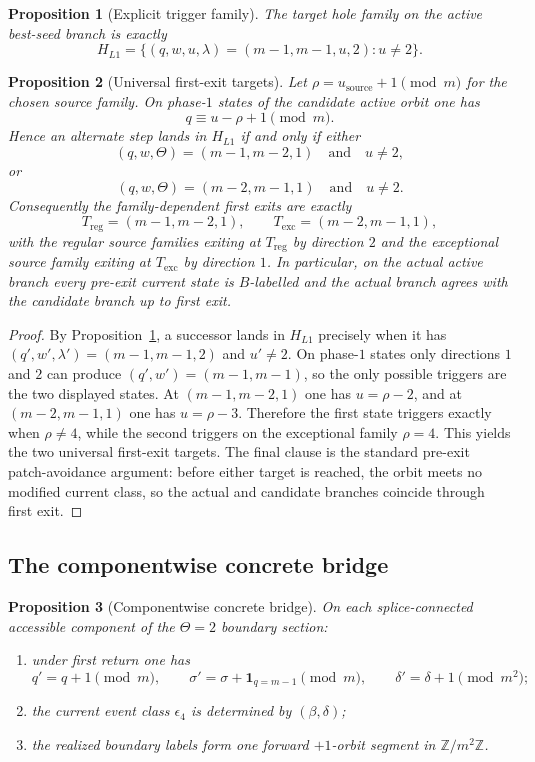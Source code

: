 \documentclass[11pt]{article}
\newtheorem{proposition}{Proposition}
\newcommand{\I}{\mathbf 1}
\begin{document}
\begin{proposition}[Explicit trigger family]\label{prop:d5-trigger}
The target hole family on the active best-seed branch is exactly
\[
H_{L1}=\{(q,w,u,\lambda)=(m-1,m-1,u,2):u\neq 2\}.
\]
\end{proposition}

\begin{proposition}[Universal first-exit targets]\label{prop:d5-first-exit}
Let $\rho=u_{\mathrm{source}}+1\pmod m$ for the chosen source family.
On phase-$1$ states of the candidate active orbit one has
\[
q\equiv u-\rho+1 \pmod m.
\]
Hence an alternate step lands in $H_{L1}$ if and only if either
\[
(q,w,\Theta)=(m-1,m-2,1)\quad\text{and}\quad u\neq 2,
\]
or
\[
(q,w,\Theta)=(m-2,m-1,1)\quad\text{and}\quad u\neq 2.
\]
Consequently the family-dependent first exits are exactly
\[
T_{\mathrm{reg}}=(m-1,m-2,1),
\qquad
T_{\mathrm{exc}}=(m-2,m-1,1),
\]
with the regular source families exiting at $T_{\mathrm{reg}}$ by direction $2$ and the exceptional source family exiting at $T_{\mathrm{exc}}$ by direction $1$.
In particular, on the actual active branch every pre-exit current state is $B$-labelled and the actual branch agrees with the candidate branch up to first exit.
\end{proposition}

\begin{proof}
By Proposition~\ref{prop:d5-trigger}, a successor lands in $H_{L1}$ precisely when it has
$(q',w',\lambda')=(m-1,m-1,2)$ and $u'\neq 2$.
On phase-$1$ states only directions $1$ and $2$ can produce $(q',w')=(m-1,m-1)$, so the only possible triggers are the two displayed states.
At $(m-1,m-2,1)$ one has $u=\rho-2$, and at $(m-2,m-1,1)$ one has $u=\rho-3$.
Therefore the first state triggers exactly when $\rho\neq 4$, while the second triggers on the exceptional family $\rho=4$.
This yields the two universal first-exit targets.
The final clause is the standard pre-exit patch-avoidance argument: before either target is reached, the orbit meets no modified current class, so the actual and candidate branches coincide through first exit.
\end{proof}

\subsection{The componentwise concrete bridge}

\begin{proposition}[Componentwise concrete bridge]\label{prop:d5-bridge}
On each splice-connected accessible component of the $\Theta=2$ boundary section:
\begin{enumerate}[label=\textup{(\roman*)},leftmargin=2.5em]
\item under first return one has
\[
q'=q+1 \pmod m,
\qquad
\sigma'=\sigma+\I_{q=m-1} \pmod m,
\qquad
\delta'=\delta+1 \pmod{m^2};
\]
\item the current event class $\epsilon_4$ is determined by $(\beta,\delta)$;
\item the realized boundary labels form one forward $+1$-orbit segment in $\mathbb Z/m^2\mathbb Z$.
\end{enumerate}
\end{proposition}
\end{document}
